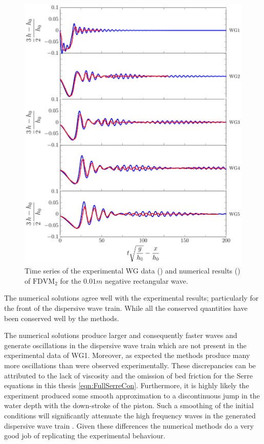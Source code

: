\begin{figure}
	\centering
	\includegraphics[width=\textwidth]{./chp6/figures/Experiment/Segur/LongWGsFDVM1cm.pdf}
	\caption{Time series of the experimental WG data ({\color{red}\solidrule}) and numerical results ({\color{blue}\solidrule}) of $\text{FDVM}_2$ for the $0.01m$ negative rectangular wave.}
	\label{fig:Segur1cmFDVM}
\end{figure} 

The numerical solutions agree well with the experimental results; particularly for the front of the dispersive wave train. While all the conserved quantities have been conserved well by the methods.

The numerical solutions produce larger and consequently faster waves and generate oscillations in the dispersive wave train which are not present in the experimental data of WG1. Moreover, as expected the methods produce many more oscillations than were observed experimentally. These discrepancies can be attributed to the lack of viscosity and the omission of bed friction for the Serre equations in this thesis \eqref{eqn:FullSerreCon}. Furthermore, it is highly likely the experiment produced some smooth approximation to a discontinuous jump in the water depth with the down-stroke of the piston. Such a smoothing of the initial conditions will significantly attenuate the high frequency waves in the generated dispersive wave train \cite{Pitt-2018-61}. Given these differences the numerical methods do a very good job of replicating the experimental behaviour.

